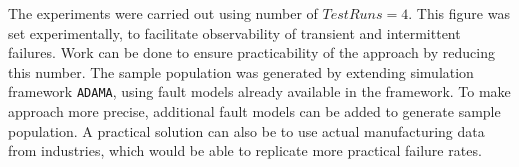 The experiments were carried out using number of $TestRuns = 4$. This figure was set experimentally, to facilitate observability of transient and intermittent failures. Work can be done to ensure practicability of the approach by reducing this number. The sample population was generated by extending simulation framework \texttt{ADAMA}, using fault models already available in the framework. To make approach more precise, additional fault models can be added to generate sample population. A practical solution can also be to use actual manufacturing data from industries, which would be able to replicate more practical failure rates.


